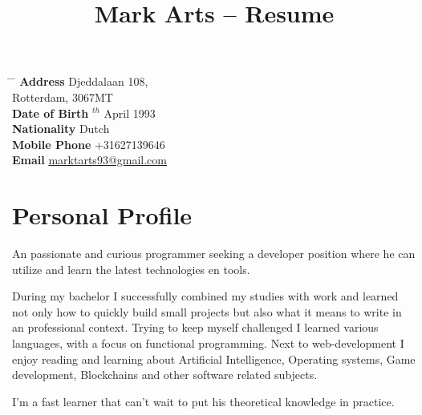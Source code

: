 \documentclass[10pt]{article} %
\begin{document}

\title{Mark Arts -- Resume} %


\parbox{0.5\textwidth}{ %
\begin{tabbing} %
\hspace{3cm} \= \hspace{4cm} \= \kill %
{\bf Address} \> Djeddalaan 108,\\ %
\> Rotterdam, 3067MT \\ %
{\bf Date of Birth} $^{th}$ April 1993 \\ %
{\bf Nationality} \> Dutch \\%
{\bf Mobile Phone} \> +31627139646 \\ %
{\bf Email} \> \href{mailto:marktarts93@gmail.com}{marktarts93@gmail.com} \\ %
\end{tabbing}}


\section{Personal Profile}

An passionate and curious programmer seeking a developer position where he can utilize and learn the latest technologies en tools. 

During my bachelor I successfully combined my studies with work and learned not only how to quickly build small projects but also what it means to write in an professional context. Trying to keep myself challenged I learned various languages, with a focus on functional programming. Next to web-development I enjoy reading and learning about Artificial Intelligence, Operating systems, Game development, Blockchains and other software related subjects.

I'm a fast learner that can't wait to put his theoretical knowledge in practice.
\end{document}
